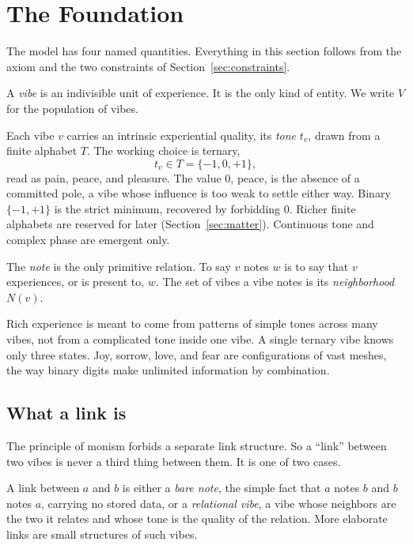 \section{The Foundation}
\label{sec:foundation}

The model has four named quantities. Everything in this section follows from the axiom and the two constraints of Section~\ref{sec:constraints}.

\begin{definition}[Vibe]
A \emph{vibe} is an indivisible unit of experience. It is the only kind of entity. We write $V$ for the population of vibes.
\end{definition}

\begin{definition}[Tone]
Each vibe $v$ carries an intrinsic experiential quality, its \emph{tone} $t_v$, drawn from a finite alphabet $T$. The working choice is ternary,
\[
t_v \in T = \{-1, 0, +1\},
\]
read as pain, peace, and pleasure. The value $0$, peace, is the absence of a committed pole, a vibe whose influence is too weak to settle either way. Binary $\{-1,+1\}$ is the strict minimum, recovered by forbidding $0$. Richer finite alphabets are reserved for later (Section~\ref{sec:matter}). Continuous tone and complex phase are emergent only.
\end{definition}

\begin{definition}[Note]
The \emph{note} is the only primitive relation. To say $v$ notes $w$ is to say that $v$ experiences, or is present to, $w$. The set of vibes a vibe notes is its \emph{neighborhood} $N(v)$.
\end{definition}

Rich experience is meant to come from patterns of simple tones across many vibes, not from a complicated tone inside one vibe. A single ternary vibe knows only three states. Joy, sorrow, love, and fear are configurations of vast meshes, the way binary digits make unlimited information by combination.

\subsection{What a link is}

The principle of monism forbids a separate link structure. So a ``link'' between two vibes is never a third thing between them. It is one of two cases.

\begin{definition}
A link between $a$ and $b$ is either a \emph{bare note}, the simple fact that $a$ notes $b$ and $b$ notes $a$, carrying no stored data, or a \emph{relational vibe}, a vibe whose neighbors are the two it relates and whose tone is the quality of the relation. More elaborate links are small structures of such vibes.
\end{definition}

